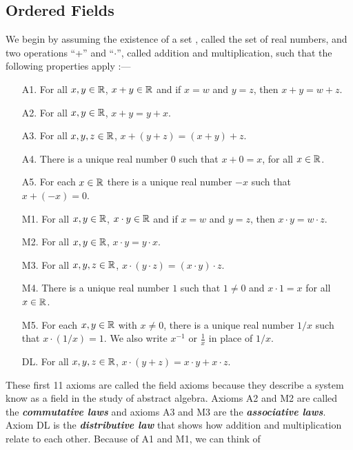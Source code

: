 \documentclass[12pt]{article}
\begin{document}
\subsection{Ordered Fields}
\label{sec:orgc3aee3b}
\begin{axiom}
  We begin by assuming the existence of a set \Real, called the set of real
  numbers, and two operations ``+'' and ``$\cdot$'', called addition and
  multiplication, such that the following properties apply :---
  \begin{itemize}
  \item [A1. ] For all $x,y \in \mathbb{R}$, $x + y \in \mathbb{R}$ and if $x = w$ and $y
    = z$, then $x + y = w + z$.
  \item [A2. ] For all $x,y \in \mathbb{R}$, $x + y = y + x$.
  \item [A3. ] For all $x,y,z \in \mathbb{R}$, $x + (y + z) = (x + y) + z$.
  \item [A4. ] There is a unique real number $0$ such that $x + 0 = x$, for all
    $x \in \mathbb{R}$.
  \item [A5. ] For each $x \in \mathbb{R}$ there is a unique real number $-x$ such
    that $x + (-x) = 0$.
  \item [M1. ] For all $x,y \in \mathbb{R}$, $x \cdot y \in \mathbb{R}$ and if $x = w$ and
    $y = z$, then $x \cdot y = w \cdot z$.
  \item [M2. ] For all $x,y \in \mathbb{R}$, $x \cdot y = y \cdot x$.
  \item [M3. ] For all $x,y,z \in \mathbb{R}$, $x \cdot (y \cdot z) =(x \cdot y)
    \cdot z$.
  \item [M4. ] There is a unique real number $1$ such that $1 \ne 0$ and $x
    \cdot 1 = x$ for all $x \in \mathbb{R}$.
  \item [M5. ] For each $x,y \in \mathbb{R}$ with $x \ne 0$, there is a unique real
    number $1/x$ such that $x \cdot (1/x) = 1$. We also write $x^{-1}$ or
    $\frac{1}{x}$ in place of $1/x$.
  \item [DL. ] For all $x,y,z \in \mathbb{R}$, $x \cdot (y + z) = x \cdot y + x \cdot
    z$.
  \end{itemize}
  \begin{remark}
    These first 11 axioms are called the field axioms because they describe a
    system know as a field in the study of abstract algebra. Axioms A2 and M2
    are called the \textit{\textbf{commutative laws}} and axioms A3 and M3 are
    the \textit{\textbf{associative laws}}. Axiom DL is the
    \textit{\textbf{distributive law}} that shows how addition and
    multiplication relate to each other. Because of A1 and M1, we can think of

\end{remark}
\end{axiom}
\end{document}
